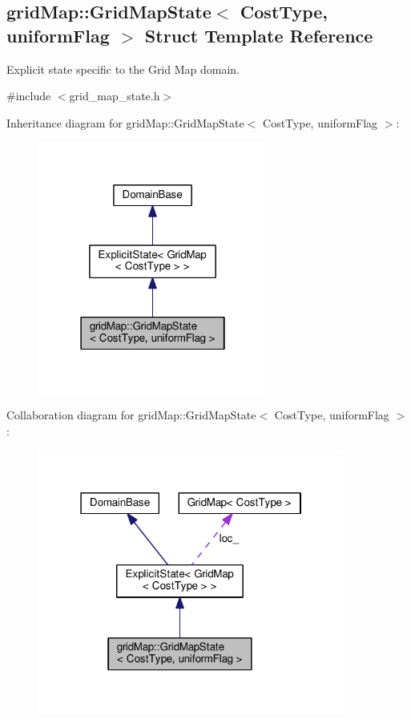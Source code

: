 \hypertarget{structgridMap_1_1GridMapState}{}\subsection{grid\+Map\+:\+:Grid\+Map\+State$<$ Cost\+Type, uniform\+Flag $>$ Struct Template Reference}
\label{structgridMap_1_1GridMapState}


Explicit state specific to the Grid Map domain.  




{\ttfamily \#include $<$grid\+\_\+map\+\_\+state.\+h$>$}



Inheritance diagram for grid\+Map\+:\+:Grid\+Map\+State$<$ Cost\+Type, uniform\+Flag $>$\+:\nopagebreak
\begin{figure}[H]
\begin{center}
\leavevmode
\includegraphics[width=214pt]{structgridMap_1_1GridMapState__inherit__graph}
\end{center}
\end{figure}


Collaboration diagram for grid\+Map\+:\+:Grid\+Map\+State$<$ Cost\+Type, uniform\+Flag $>$\+:\nopagebreak
\begin{figure}[H]
\begin{center}
\leavevmode
\includegraphics[width=286pt]{structgridMap_1_1GridMapState__coll__graph}
\end{center}
\end{figure}
